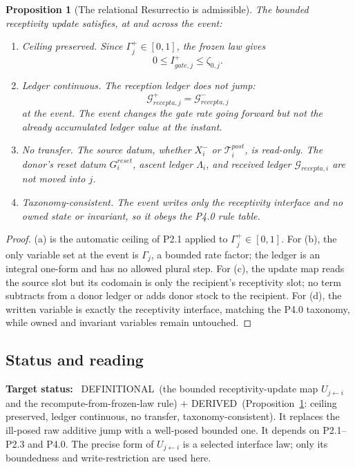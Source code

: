 \documentclass[11pt,a4paper]{article}
\def\mathfrak#1{#1}%
\def\mathrm#1{#1}%
\def\emph#1{#1}%
\newcommand{\stDerived}{\textcolor{cDer}{\textsf{\small DERIVED}}}
\newcommand{\stDef}{\textcolor{cDef}{\textsf{\small DEFINITIONAL}}}
\theoremstyle{definition}
\theoremstyle{plain}
\newtheorem{proposition}[definition]{Proposition}
\theoremstyle{remark}
\begin{document}
\begin{proposition}[The relational Resurrectio is admissible]\label{prop:relres}
The bounded receptivity update satisfies, at and across the event:
\begin{enumerate}[label=\textup{(\alph*)},leftmargin=1.2cm]
\item \emph{Ceiling preserved.} Since \(\Gamma_j^{+}\in[0,1]\), the frozen law gives
\[
0\le I_{\mathrm{gate},j}^{+}\le\zeta_{0,j}.
\]
\item \emph{Ledger continuous.} The reception ledger does not jump:
\[
\mathcal G_{\mathrm{recepta},j}^{+}
=
\mathcal G_{\mathrm{recepta},j}^{-}
\]
at the event. The event changes the gate rate going forward but not the already
accumulated ledger value at the instant.
\item \emph{No transfer.} The source datum, whether \(X_i^-\) or
\(\mathcal T_i^{\mathrm{post}}\), is read-only. The donor's reset datum
\(G_i^{\mathrm{reset}}\), ascent ledger \(\Lambda_i\), and received ledger
\(\mathcal G_{\mathrm{recepta},i}\) are not moved into \(j\).
\item \emph{Taxonomy-consistent.} The event writes only the receptivity interface
and no owned state or invariant, so it obeys the P4.0 rule table.
\end{enumerate}
\end{proposition}

\begin{proof}
(a) is the automatic ceiling of P2.1 applied to \(\Gamma_j^{+}\in[0,1]\). For
(b), the only variable set at the event is \(\Gamma_j\), a bounded rate factor; the
ledger is an integral one-form and has no allowed plural step. For (c), the update
map reads the source slot but its codomain is only the recipient's receptivity
slot; no term subtracts from a donor ledger or adds donor stock to the recipient.
For (d), the written variable is exactly the receptivity interface, matching the
P4.0 taxonomy, while owned and invariant variables remain untouched. \qedhere
\end{proof}

\subsection{Status and reading}

\textbf{Target status:}~
\stDef\ (the bounded receptivity-update map \(\mathfrak U_{j\leftarrow i}\) and the recompute-from-frozen-law
rule) \(+\) \stDerived\ (Proposition~\ref{prop:relres}: ceiling preserved, ledger continuous,
no transfer, taxonomy-consistent). It replaces the ill-posed raw additive jump with a
well-posed bounded one. It depends on P2.1--P2.3 and P4.0. The precise form of
\(\mathfrak U_{j\leftarrow i}\) is a selected interface law; only its boundedness and write-restriction
are used here.
\end{document}
